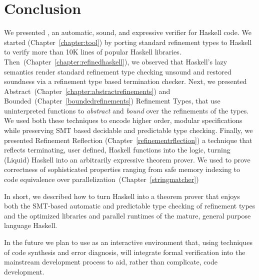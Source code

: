 \chapter{Conclusion}\label{chapter:conclusion}

We presented \toolname, an automatic, sound, and expressive verifier for Haskell code. 
%
We started (Chapter~\ref{chapter:tool}) by porting standard refinement types 
to Haskell to verify more than 10K lines of popular Haskell libraries. 
%
Then~(Chapter~\ref{chapter:refinedhaskell}), we observed that Haskell's 
lazy semantics render standard refinement type checking unsound
and restored soundness via a refinement type based termination checker.
%
Next, we presented Abstract~(Chapter~\ref{chapter:abstractrefinements}) 
and Bounded~(Chapter~\ref{boundedrefinements}) Refinement Types, 
that use uninterpreted functions to 
\textit{abstract} and \textit{bound} over the refinements of the types. 
We used both these techniques to encode higher order, modular specifications
while preserving SMT based decidable and predictable type checking. 
%
Finally, we presented Refinement Reflection (Chapter~\ref{refinementrflection})
a technique that reflects terminating, user defined, 
Haskell functions into the logic, 
turning (Liquid) Haskell into an arbitrarily expressive 
theorem prover. 
%
We used \toolname to prove correctness 
of sophisticated properties ranging from 
safe memory indexing to code equivalence over parallelization~(Chapter~\ref{stringmatcher})

In short, we described how to turn Haskell into a theorem prover
that enjoys both 
the SMT-based automatic and predictable type checking
of refinement types
and 
the optimized libraries and parallel runtimes of 
the mature, general purpose language Haskell.

In the future we plan to use \toolname as an interactive environment 
that, using techniques of code synthesis and error diagnosis, 
will integrate formal verification into the mainstream development process 
to aid, rather than complicate, code development.




